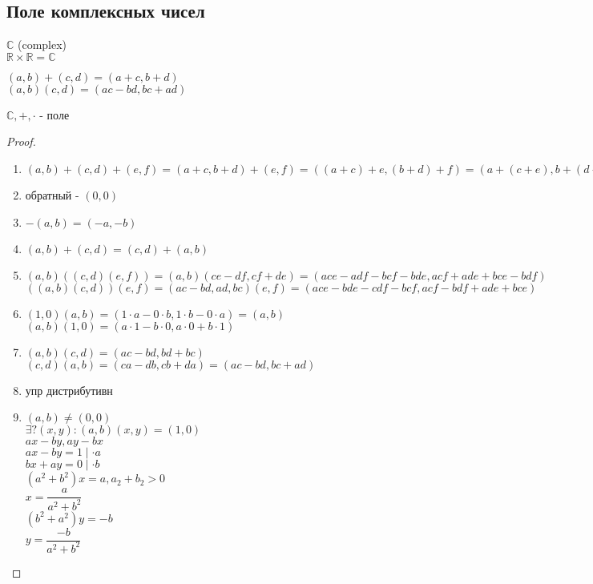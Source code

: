 
\subsection{Поле комплексных чисел} 

$ \mathbb{C} $ (complex) \\
$ \mathbb{R} \times \mathbb{R} = \mathbb{C}  $\\
\begin{definition}
	$ (a, b) + (c, d) = (a+c, b+d) $\\
	$(a,b) (c, d) = (ac - bd, bc + ad) $\\
\end{definition}
\begin{theorem}
	$ \mathbb{C}, +, \cdot $ - поле 
	\begin{proof}
		\begin{enumerate}
			\item $ (a, b) + (c, d) + (e, f) = (a + c, b+ d) + (e, f) = ((a+c) + e, (b+d) + f) = (a + (c+e), b + (d+f)) = (a, b) + (c+e, d+f) = (a, b) + ((c, d) + (e, f))$
			\item обратный - $ (0, 0) $
			\item $-(a, b) = (-a, -b) $
			\item $ (a, b) + (c, d) = (c, d) + (a, b) $ 
			\item $ (a, b) ((c,d) (e, f)) = (a, b)(ce-df, cf+de) = (ace - adf - bcf - bde , acf+ade+bce-bdf)  $ \\
			$ ((a, b)(c, d))(e, f) = (ac - bd, ad, bc) (e,f) = (ace - bde - cdf - bcf,  acf - bdf + ade + bce)  $
			\item $(1, 0) (a, b) = (1\cdot a - 0 \cdot b, 1 \cdot b - 0 \cdot a) = (a, b)$ \\
			$ (a, b)(1, 0) = (a \cdot 1 - b \cdot 0 , a \cdot 0 + b \cdot 1) $ 
			\item $ (a,b) (c, d) = (ac-bd, bd+bc) $ \\
			$ (c, d)(a, b) = (ca - db, cb + da) = (ac - bd, bc + ad) $ 
			\item упр дистрибутивн
			\item $ (a, b) \neq (0, 0) $ \\
			$ \exists ? (x, y) : (a, b)(x, y) = (1, 0) $ \\
			$ ax - by, ay - bx $ \\
			$ ax - by = 1  \mid \cdot a$\\
			$ bx + ay = 0  \mid  \cdot b$\\
			$ (a^2 + b^2)x = a, a_2 + b_2 > 0 $\\
			$ x = \dfrac{a}{a^2 + b^2} $ \\
			$ (b^2 + a^2) y = -b $ \\
			$ y = \dfrac{-b}{a^2 + b^2} $ %
 		\end{enumerate}
	\end{proof}
\end{theorem}
